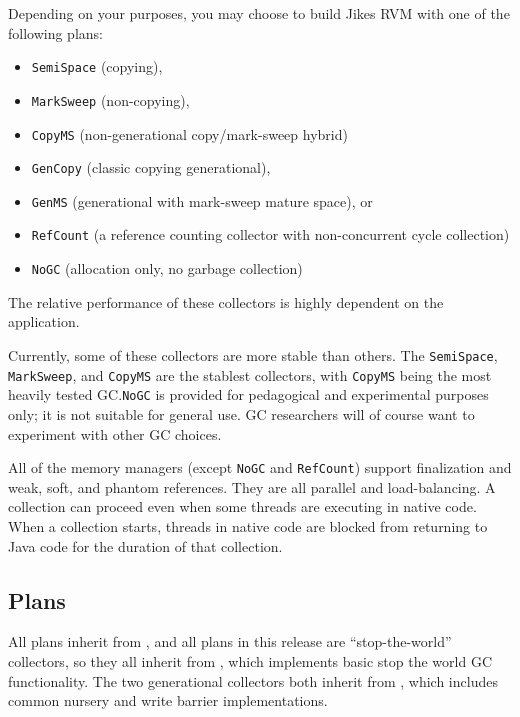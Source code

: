 Depending on your purposes, you may choose to build Jikes RVM with one
of the following plans:
\begin{itemize}
\item \texttt{SemiSpace} (copying),
\item \texttt{MarkSweep} (non-copying),
\item \texttt{CopyMS} (non-generational copy/mark-sweep hybrid)
\item \texttt{GenCopy} (classic copying generational),
\item \texttt{GenMS} (generational with mark-sweep mature space), or
\item \texttt{RefCount} (a reference counting collector with non-concurrent cycle collection)
\item \texttt{NoGC} (allocation only, no garbage collection)
\end{itemize}
The relative performance of these collectors is highly dependent on
the application. 


Currently, some of these collectors are more stable than others. 
The \texttt{SemiSpace}, \texttt{MarkSweep}, and \texttt{CopyMS} 
are the stablest collectors, with \texttt{CopyMS} being the
most heavily tested GC.\@  \texttt{NoGC} is provided for pedagogical and
experimental purposes only; it is not suitable for general use.
GC researchers will of course want to experiment with other GC choices.

All of the memory managers (except \texttt{NoGC} and \texttt{RefCount}) 
support finalization and weak, soft, and phantom references.  They are all parallel 
and load-balancing.  A collection can proceed even when some threads are
executing in native code. When a collection starts, threads in native
code are blocked from returning to Java code for the duration of that
collection.

\subsection{Plans} \label{sssec:plans}

All plans inherit from ,
and all plans in this release are ``stop-the-world'' collectors, so
they all inherit from
, which implements
basic stop the world GC functionality.  The two generational
collectors both inherit from
, which includes
common nursery and write barrier implementations.

